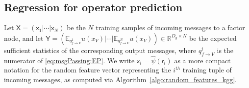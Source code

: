 \documentclass[english]{article}
\theoremstyle{plain}
\theoremstyle{plain}
\newcommand{\factor}{f}				%
\newcommand{\outV}{V}                         %
\begin{document}



\subsection{Regression for operator prediction}\label{sec:ridgeRegression}

Let $\mathsf{X}=\left(\mathsf{x}_{1}|\cdots|\mathsf{x}_{N}\right)$
be the $N$ training samples of incoming messages to a factor node, and let $\mathsf{Y}=\left(\mathbb{E}_{q_{\factor\rightarrow \outV}^{1}}u(x_{\outV})|\cdots|\mathbb{E}_{q_{f\rightarrow \outV}^{N}}u(x_{\outV})\right)\in\mathbb{R}^{D_{y}\times N}$
be the expected sufficient statistics of the corresponding  output messages, 
where $q^i_{\factor \rightarrow \outV}$ is the numerator 
of \eqref{eq:msgPassing:EP}.
We write $\mathsf{x}_{i}= \hat{\psi}(\mathsf{r}_i)$
as a more compact notation for the random feature
vector representing the $i^{th}$ training tuple of incoming messages, 
as computed via Algorithm~\ref{algo:random_features_kgg}.
\end{document}
